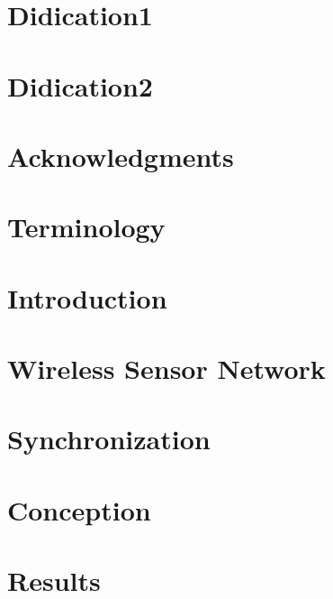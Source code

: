 \documentclass[12]{report}
\begin{document}
	
	
	\chapter*{Didication1}	
	\chapter*{Didication2}
	\chapter*{Acknowledgments}
	
	
	
	\chapter*{Terminology}
	
	
	\tableofcontents
	
	
	\listoffigures

	


	
	\chapter*{Introduction}
	
	
	
	\chapter{Wireless Sensor Network}
	
	
	\chapter{Synchronization}
	
	
	\chapter{Conception}
	
	
	\chapter{Results}
	
	\printbibliography
\end{document}
